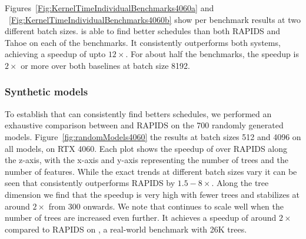 
Figures~\ref{Fig:KernelTimeIndividualBenchmarks4060a} and ~\ref{Fig:KernelTimeIndividualBenchmarks4060b} 
show per benchmark results at two different batch sizes. 
\Treebeard{} is able to find better schedules than both RAPIDS and Tahoe on each of the benchmarks. It consistently
outperforms both systems, achieving a speedup of upto $12\times$.
For about half the benchmarks, the speedup is $2\times$ or more over both baselines at batch size 8192.
\subsubsection*{Synthetic models}
To establish that \Treebeard{} can consistently find betters schedules, we performed an exhaustive comparison between \Treebeard{} and RAPIDS on the 700 randomly generated models.   
Figure~\ref{fig:randomModels4060} the results at batch sizes 512 and 4096 on all models, on RTX 4060. 
Each plot shows the speedup of \Treebeard{} over RAPIDS along the z-axis, with the x-axis and y-axis representing the number of trees and the number of features. 
While the exact trends at different batch sizes vary it can be seen that \Treebeard{} consistently outperforms RAPIDS by $1.5-8\times$. Along the tree 
dimension we find that the speedup is very high with fewer trees and stabilizes at around $2\times$ from 300 onwards. We note that \Treebeard{} continues to scale well 
when the number of trees are increased even further. It achieves a speedup of around $2\times$ compared to RAPIDS on , a real-world benchmark
with 26K trees.

